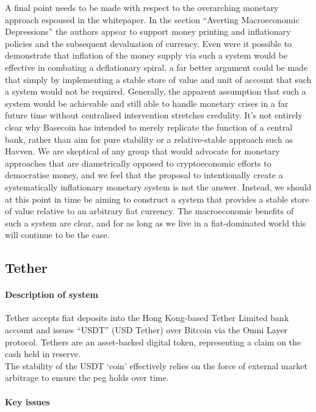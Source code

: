 \noindent A final point needs to be made with respect to the overarching monetary approach
espoused in the whitepaper. In the section ``Averting Macroeconomic Depressions'' the authors appear to support
money printing and inflationary policies and the subsequent devaluation of currency. Even were it possible to
demonstrate that inflation of the money supply via such a system would be effective in combating a deflationary spiral,
a far better argument could be made that simply by implementing a stable store of value and unit of account that such a
system would not be required. Generally, the apparent assumption that such a system would be achievable and still able to
handle monetary crises in a far future time without centralised intervention stretches credulity. It's not entirely clear
why Basecoin has intended to merely replicate the function of a central bank, rather than aim for pure stability or a
relative-stable approach such as Havven. We are skeptical of any group that would advocate for monetary approaches that are
diametrically opposed to cryptoeconomic efforts to democratise money, and we feel that the proposal to intentionally
create a systematically inflationary monetary system is not the answer. Instead, we should at this point in time be
aiming to construct a system that provides a stable store of value relative to an arbitrary fiat currency. The macroeconomic
benefits of such a system are clear, and for as long as we live in a fiat-dominated world this will continue to be the case.

\subsection{Tether}

\paragraph{Description of system}

Tether accepts fiat deposits into the Hong Kong-based Tether Limited bank account and issues ``USDT'' (USD Tether) over Bitcoin via the Omni Layer protocol. Tethers are an asset-backed digital token, representing a claim on the cash held in reserve. \\

\noindent The stability of the USDT `coin' effectively relies on the force of external market arbitrage to ensure the peg holds over time.

\paragraph{Key issues}

